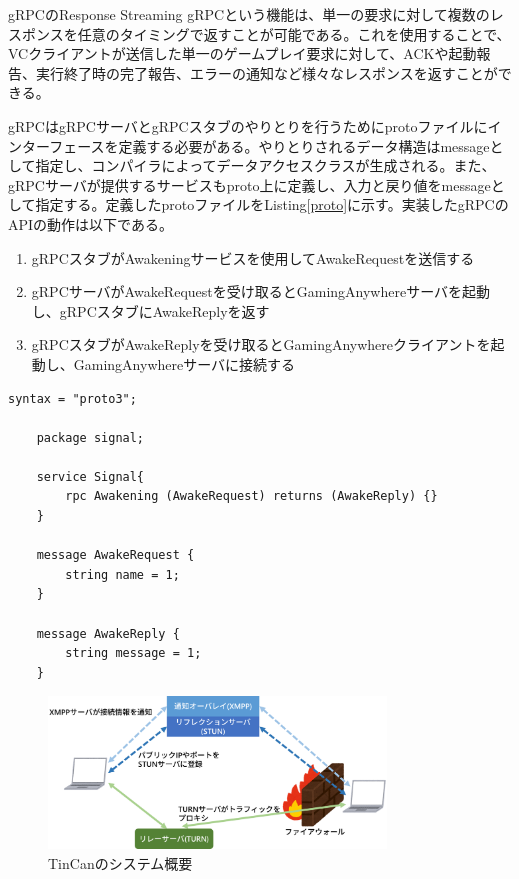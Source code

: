 gRPCのResponse Streaming gRPCという機能は、単一の要求に対して複数のレスポンスを任意のタイミングで返すことが可能である。これを使用することで、VCクライアントが送信した単一のゲームプレイ要求に対して、ACKや起動報告、実行終了時の完了報告、エラーの通知など様々なレスポンスを返すことができる。

gRPCはgRPCサーバとgRPCスタブのやりとりを行うためにprotoファイルにインターフェースを定義する必要がある。やりとりされるデータ構造はmessageとして指定し、コンパイラによってデータアクセスクラスが生成される。また、gRPCサーバが提供するサービスもproto上に定義し、入力と戻り値をmessageとして指定する。定義したprotoファイルをListing\ref{proto}に示す。実装したgRPCのAPIの動作は以下である。

\begin{enumerate}
    \item gRPCスタブがAwakeningサービスを使用してAwakeRequestを送信する
    \item gRPCサーバがAwakeRequestを受け取るとGamingAnywhereサーバを起動し、gRPCスタブにAwakeReplyを返す
    \item gRPCスタブがAwakeReplyを受け取るとGamingAnywhereクライアントを起動し、GamingAnywhereサーバに接続する
\end{enumerate}

\begin{lstlisting}[caption=protoファイル,label=proto]
    syntax = "proto3";

    package signal;

    service Signal{
        rpc Awakening (AwakeRequest) returns (AwakeReply) {}
    }

    message AwakeRequest {
        string name = 1;
    }

    message AwakeReply {
        string message = 1;
    }
\end{lstlisting}


\begin{figure}[t]
    \centering
    \includegraphics[width=0.8\textwidth,keepaspectratio,clip]{img/tincan.eps}
    \caption{TinCanのシステム概要}
    \label{fig:tincan}
\end{figure}

